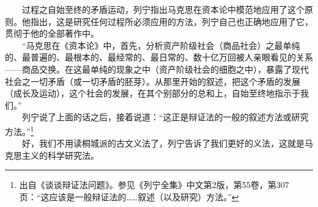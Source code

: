 \documentclass[cn,11pt,chinese]{elegantbook}
\begin{document}
　　过程之自始至终的矛盾运动，列宁指出马克思在资本论中模范地应用了这个原则。他指出，这是研究任何过程所必须应用的方法，列宁自己也正确地应用了它，贯彻于他的全部著作中。\\
　　“马克思在《资本论》中，首先，分析资产阶级社会（商品社会）之最单纯的、最普遍的、最根本的、最经常的、最日常的、数十亿万回被人亲眼看见的关系——商品交换。在这最单纯的现象之中（资产阶级社会的细胞之中），暴露了现代社会之一切矛盾（或一切矛盾的胚芽）。从那里开始的叙述，把这个矛盾的发展（成长及运动），这个社会的发展，在其个别部分的总和上，自始至终地指示于我们。”\\
　　列宁说了上面的话之后，接着说道：“这正是辩证法的一般的叙述方法或研究方法。”\footnote[7]{ 出自《谈谈辩证法问题》。参见《列宁全集》中文第2版，第55卷，第307页：“这应该是一般辩证法的……叙述（以及研究）方法。”}\\
　　好，我们不用读桐城派的古文义法了，列宁告诉了我们更好的义法，这就是马克思主义的科学研究法。\\
\end{document}
